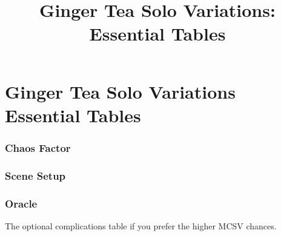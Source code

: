 

\title{Ginger Tea Solo Variations: Essential Tables}


\mainmatter
\chapter*{Ginger Tea Solo Variations\hspace*{8cm} Essential Tables \version}
\subsection{Chaos Factor}

\subsection{Scene Setup}


\newpage
\subsection{Oracle}


The optional complications table if you prefer the higher MCSV chances.


